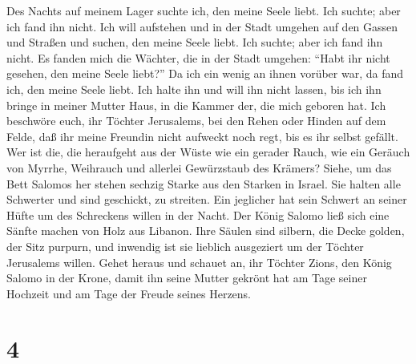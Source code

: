  Des Nachts auf meinem Lager suchte ich, den meine Seele
liebt. Ich suchte; aber ich fand ihn nicht.  Ich will
aufstehen und in der Stadt umgehen auf den Gassen und Straßen und
suchen, den meine Seele liebt. Ich suchte; aber ich fand ihn nicht.
 Es fanden mich die Wächter, die in der Stadt umgehen:
``Habt ihr nicht gesehen, den meine Seele liebt?''  Da ich
ein wenig an ihnen vorüber war, da fand ich, den meine Seele liebt. Ich
halte ihn und will ihn nicht lassen, bis ich ihn bringe in meiner Mutter
Haus, in die Kammer der, die mich geboren hat.  Ich
beschwöre euch, ihr Töchter Jerusalems, bei den Rehen oder Hinden auf
dem Felde, daß ihr meine Freundin nicht aufweckt noch regt, bis es ihr
selbst gefällt.  Wer ist die, die heraufgeht aus der Wüste
wie ein gerader Rauch, wie ein Geräuch von Myrrhe, Weihrauch und
allerlei Gewürzstaub des Krämers?  Siehe, um das Bett
Salomos her stehen sechzig Starke aus den Starken in Israel.
 Sie halten alle Schwerter und sind geschickt, zu streiten.
Ein jeglicher hat sein Schwert an seiner Hüfte um des Schreckens willen
in der Nacht.  Der König Salomo ließ sich eine Sänfte machen
von Holz aus Libanon.  Ihre Säulen sind silbern, die Decke
golden, der Sitz purpurn, und inwendig ist sie lieblich ausgeziert um
der Töchter Jerusalems willen.  Gehet heraus und schauet
an, ihr Töchter Zions, den König Salomo in der Krone, damit ihn seine
Mutter gekrönt hat am Tage seiner Hochzeit und am Tage der Freude seines
Herzens.

\hypertarget{section-3}{%
\section{4}\label{section-3}}

